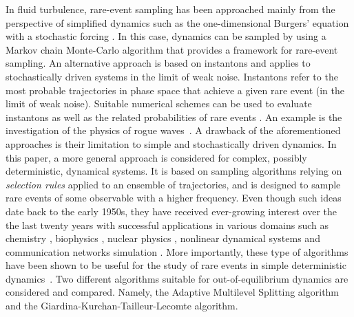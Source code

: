 \documentclass{jfm}
\newcommand{\EL}[1]{{\color{myred}{#1}}}
\begin{document}
%
In fluid turbulence, rare-event sampling has been approached mainly from the perspective of simplified dynamics such as the one-dimensional Burgers' equation with a stochastic forcing \citep{bec_burgers_2007}. In this case, dynamics can be sampled by using a Markov chain Monte-Carlo algorithm \citep{duben_monte_2008,mesterhazy2011anomalous,mesterhazy2013lattice} that provides a framework for rare-event sampling.
%
An alternative approach is based on instantons \citep{gurarie_instantons_1996,grafke2015instanton} and applies to stochastically driven systems in the limit of weak noise.
Instantons refer to the most probable trajectories in phase space that achieve a given rare event (in the limit of weak noise). Suitable numerical schemes can be used to evaluate instantons as well as the related probabilities of rare events \citep{chernykh_large_2001,grafke_instanton_2013,grigorio_instantons_2017,laurie2015computation,bouchet2014langevin}.
An example is the investigation of the physics of rogue waves~\citep{dematteis2018rogue,dematteis2019experimental}.
%
A drawback of the aforementioned approaches is their limitation to simple and stochastically driven dynamics.
%
%
%
In this paper, a more general approach is considered for complex, possibly deterministic, dynamical systems.
It is based on sampling algorithms relying on \emph{selection rules} applied to an ensemble of trajectories, and is designed to sample rare events of some observable with a higher frequency.
%
%
Even though such ideas date back to the early 1950s, they have received ever-growing interest over the the last twenty years with successful applications in various domains such as chemistry \citep{van_erp_elaborating_2005,escobedo_transition_2009,teo_adaptive_2016}, biophysics \citep{huber_weighted-ensemble_1996,zuckerman2017weighted,bolhuis2005kinetic}, nuclear physics \citep{louvin2017}, nonlinear dynamical systems \citep{tailleur_probing_2007} and communication networks simulation \citep{villen-altamirano_restart:_1994}.
More importantly, these type of algorithms have been shown to be useful for the study of rare events in simple deterministic dynamics~\citep{wouters2016rare}.
%
%
\EL{An original contribution of the present work is certainly to test the application of rare-event sampling algorithms in the context of far-from-equilibrium dynamics with an irreducible very large number of degrees of freedom. }
%
Two different algorithms suitable for out-of-equilibrium dynamics are considered and compared. Namely, the Adaptive Multilevel Splitting algorithm and the Giardina-Kurchan-Tailleur-Lecomte algorithm.
%
\end{document}
